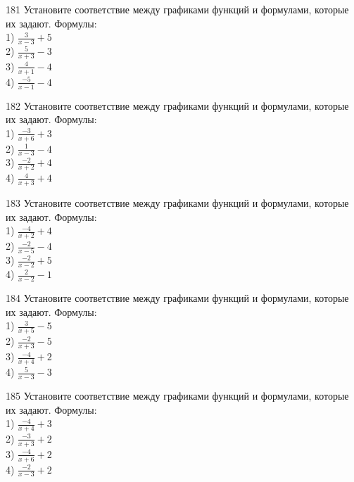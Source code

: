 \documentclass[4apaper]{article}
\begin{document}
\begin{taskBN}{181}
Установите соответствие между графиками функций и формулами, которые их задают. Формулы: \\1) $\frac{3}{x-3}+5$\\2) $\frac{5}{x+3}-3$\\3) $\frac{4}{x+1}-4$\\4) $\frac{-5}{x-1}-4$
\end{taskBN}

\begin{taskBN}{182}
Установите соответствие между графиками функций и формулами, которые их задают. Формулы: \\1) $\frac{-3}{x+6}+3$\\2) $\frac{1}{x-3}-4$\\3) $\frac{-2}{x+2}+4$\\4) $\frac{4}{x+3}+4$
\end{taskBN}

\begin{taskBN}{183}
Установите соответствие между графиками функций и формулами, которые их задают. Формулы: \\1) $\frac{-4}{x+2}+4$\\2) $\frac{-2}{x-5}-4$\\3) $\frac{-2}{x-2}+5$\\4) $\frac{2}{x-2}-1$
\end{taskBN}

\begin{taskBN}{184}
Установите соответствие между графиками функций и формулами, которые их задают. Формулы: \\1) $\frac{3}{x+5}-5$\\2) $\frac{-2}{x+3}-5$\\3) $\frac{-4}{x+4}+2$\\4) $\frac{5}{x-3}-3$
\end{taskBN}

\begin{taskBN}{185}
Установите соответствие между графиками функций и формулами, которые их задают. Формулы: \\1) $\frac{-4}{x+4}+3$\\2) $\frac{-3}{x+3}+2$\\3) $\frac{-4}{x+6}+2$\\4) $\frac{-2}{x-3}+2$
\end{taskBN}
\end{document}
